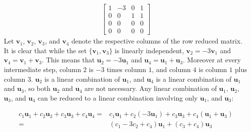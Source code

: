 \documentclass{article}
\begin{document}
\begin{itemize}
\begin{align*}
\begin{bmatrix}
1 & -3 & 0 & 1 \\
0 &  0 & 1 & 1 \\
0 &  0 & 0 & 0 \\ 
0 &  0 & 0 & 0 
\end{bmatrix}
\end{align*}
Let \(\mathbf{v}_1\), \(\mathbf{v}_2\), \(\mathbf{v}_3\), and \(\mathbf{v}_4\) denote the respective columns of the row reduced matrix. It is clear that while the set \(\{\mathbf{v}_1, \mathbf{v}_3\}\) is linearly independent, \(\mathbf{v}_2 = -3\mathbf{v}_1\) and \(\mathbf{v}_4 = \mathbf{v}_1 + \mathbf{v}_3\). This means that \(\mathbf{u}_2 = -3\mathbf{u}_1\) and \(\mathbf{u}_4 = \mathbf{u}_1 + \mathbf{u}_3\). Moreover at every intermediate step, column \(2\) is \(-3\) times column \(1\), and column \(4\) is column \(1\) plus column \(3\). \(\mathbf{u}_2\) is a linear combination of \(\mathbf{u}_1\), and \(\mathbf{u}_4\) is a linear combination of \(\mathbf{u}_1\) and \(\mathbf{u}_3\), so both \(\mathbf{u}_2\) and \(\mathbf{u}_4\) are not necessary. Any linear combination of \(\mathbf{u}_1\), \(\mathbf{u}_2\), \(\mathbf{u}_3\), and \(\mathbf{u}_4\) can be reduced to a linear combination involving only \(\mathbf{u}_1\), and \(\mathbf{u}_3\):

\begin{align*}   
c_1 \mathbf{u}_1 + c_2 \mathbf{u}_2 + c_3 \mathbf{u}_3 + c_4 \mathbf{u}_4 
= & c_1 \mathbf{u}_1 + c_2 (-3\mathbf{u}_1) + c_3 \mathbf{u}_3 + c_4(\mathbf{u}_1 + \mathbf{u}_3)\\
= & (c_1 - 3c_2 + c_4)\mathbf{u}_1 + (c_3 + c_4)\mathbf{u}_3
\end{align*}   


\end{itemize}
\end{document}

